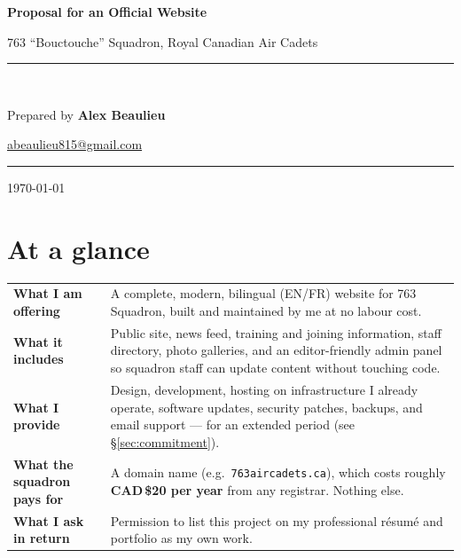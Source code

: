 \documentclass[11pt,letterpaper]{article}
\makeatletter
\newcommand{\propTitle}{Proposal for an Official Website}
\newcommand{\propSubtitle}{763 ``Bouctouche'' Squadron, Royal Canadian Air Cadets}
\newcommand{\propAuthor}{Alex Beaulieu}
\newcommand{\propEmail}{abeaulieu815@gmail.com}
\newcommand{\propDate}{\today}
\makeatother
\begin{document}
\begin{titlepage}
\centering
\vspace*{2cm}

{\Huge\bfseries\color{accent}\propTitle\par}
\vspace{0.6cm}
{\Large\propSubtitle\par}

\vspace{2.5cm}
\rule{0.6\linewidth}{0.4pt}\\[0.4cm]
{\large Prepared by \textbf{\propAuthor}\par}
{\normalsize \href{mailto:\propEmail}{\propEmail}\par}
\vspace{0.4cm}
\rule{0.6\linewidth}{0.4pt}

\vfill
{\normalsize\color{muted}\propDate\par}
\end{titlepage}

\section*{At a glance}

\begin{tabularx}{\linewidth}{@{}l X@{}}
\toprule
\textbf{What I am offering} & A complete, modern, bilingual (EN/FR) website for 763 Squadron, built and maintained by me at no labour cost. \\
\textbf{What it includes}   & Public site, news feed, training and joining information, staff directory, photo galleries, and an editor-friendly admin panel so squadron staff can update content without touching code. \\
\textbf{What I provide}     & Design, development, hosting on infrastructure I already operate, software updates, security patches, backups, and email support --- for an extended period (see \S\ref{sec:commitment}). \\
\textbf{What the squadron pays for} & A domain name (e.g.\ \texttt{763aircadets.ca}), which costs roughly \textbf{CAD\,\$20 per year} from any registrar. Nothing else. \\
\textbf{What I ask in return} & Permission to list this project on my professional résumé and portfolio as my own work. \\
\bottomrule
\end{tabularx}
\end{document}
